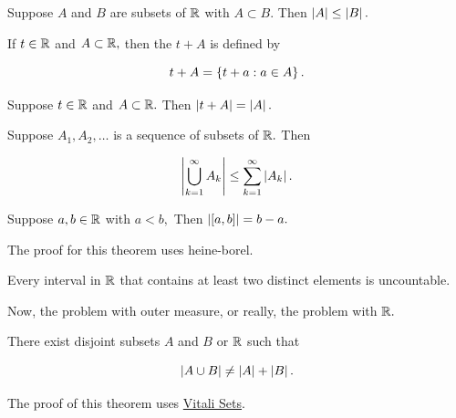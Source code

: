\documentclass{article}
\begin{document}
\begin{theorem}
	Suppose $A$ and $B$ are \@{subsets} of $\mathbb{R}$ with $A \subset B.$ Then $\left| A \right| \leq \left| B \right|.$
\end{theorem}

\begin{definition}[translation]
	If $t \in \mathbb{R}$ and $A \subset \mathbb{R},$ then the  $t + A$ is defined by

	\[ t + A = \left\{ t + a : a \in A \right\}. \]
\end{definition}

\begin{theorem}
Suppose $t \in \mathbb{R}$ and $A \subset \mathbb{R}.$ Then $\left| t + A \right| = \left| A \right|.$
\end{theorem}

\begin{theorem}
	Suppose $A_1, A_2, \dots$ is a \@{sequence} of \@{subsets} of $\mathbb{R}.$ Then

	\[ \left| \bigcup_{k=1}^{\infty} A_k \right| \leq \sum_{k=1}^{\infty} \left| A_k \right|.  \]
\end{theorem}

\begin{theorem}
	Suppose $a,b \in \mathbb{R}$ with $a < b,$ Then $\left| [a,b] \right| = b - a.$
\end{theorem}
\begin{note}
	The proof for this theorem uses \@{heine-borel}.
\end{note}

\begin{theorem}
	Every \@{interval} in $\mathbb{R}$ that contains at least two \@{distinct} \@{elements} is \@{uncountable}.
\end{theorem}


Now, the problem with \@{outer measure}, or really, the problem with $\mathbb{R}.$

\begin{theorem}
	There exist \@{disjoint} \@{subsets} $A$ and $B$ or $\mathbb{R}$ such that

	\[ \left| A \cup B \right| \neq \left| A \right| + \left| B \right|. \]
\end{theorem}
\begin{note}
	The proof of this theorem uses \href{https://en.wikipedia.org/wiki/Vitali_set}{Vitali Sets}. 
\end{note}
\end{document}
